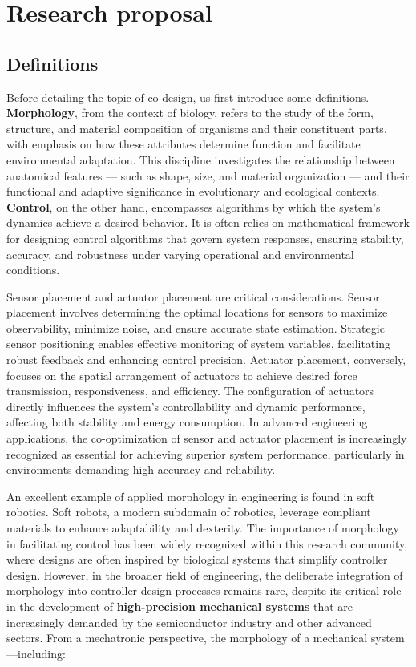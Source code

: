 \hypertarget{research-proposal}{%
\section{Research proposal}\label{research-proposal}}

\subsection*{Definitions}

Before detailing the topic of co-design, us first introduce some
definitions. \textbf{Morphology}, from the context of biology, refers to
the study of the form, structure, and material composition of organisms
and their constituent parts, with emphasis on how these attributes
determine function and facilitate environmental adaptation. This
discipline investigates the relationship between anatomical features ---
such as shape, size, and material organization --- and their functional
and adaptive significance in evolutionary and ecological contexts.
\textbf{Control}, on the other hand, encompasses algorithms by which the
system's dynamics achieve a desired behavior. It is often relies on
mathematical framework for designing control algorithms that govern
system responses, ensuring stability, accuracy, and robustness under
varying operational and environmental conditions.

Sensor placement and actuator placement are critical considerations.
Sensor placement involves determining the optimal locations for sensors
to maximize observability, minimize noise, and ensure accurate state
estimation. Strategic sensor positioning enables effective monitoring of
system variables, facilitating robust feedback and enhancing control
precision. Actuator placement, conversely, focuses on the spatial
arrangement of actuators to achieve desired force transmission,
responsiveness, and efficiency. The configuration of actuators directly
influences the system's controllability and dynamic performance,
affecting both stability and energy consumption. In advanced engineering
applications, the co-optimization of sensor and actuator placement is
increasingly recognized as essential for achieving superior system
performance, particularly in environments demanding high accuracy and
reliability.

An excellent example of applied morphology in engineering is found in
soft robotics. Soft robots, a modern subdomain of robotics, leverage
compliant materials to enhance adaptability and dexterity. The
importance of morphology in facilitating control has been widely
recognized within this research community, where designs are often
inspired by biological systems that simplify controller design. However,
in the broader field of engineering, the deliberate integration of
morphology into controller design processes remains rare, despite its
critical role in the development of \textbf{high-precision mechanical
systems} that are increasingly demanded by the semiconductor industry
and other advanced sectors. From a mechatronic perspective, the
morphology of a mechanical system---including:

